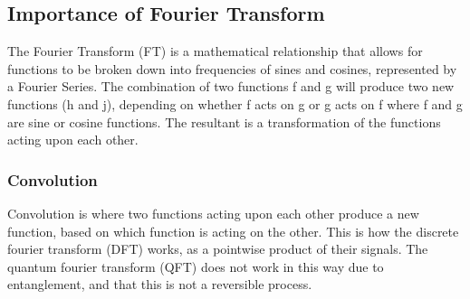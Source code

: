\documentclass[a4paper,11pt]{article}
\theoremstyle{mytheor}
\begin{document}

\subsection{Importance of Fourier Transform}
\cite{Heat}\cite{FFTA}\cite{Probab}\cite{Harm}
The Fourier Transform (FT) is a mathematical relationship that allows for functions to be broken down into frequencies of sines and cosines, represented by a Fourier Series.  The combination of two functions f and g will produce two new functions (h and j), depending on whether f acts on g or g acts on f where f and g are sine or cosine functions.  The resultant is a transformation of the functions acting upon each other. 

\subsubsection{Convolution}
\cite{Asym}\cite{Qconvq}\cite{FFTA}
Convolution is where two functions acting upon each other produce a new function, based on which function is acting on the other.  This is how the discrete fourier transform (DFT) works, as a pointwise product of their signals.  The quantum fourier transform (QFT) does not work in this way due to entanglement, and that this is not a reversible process.
\end{document}
